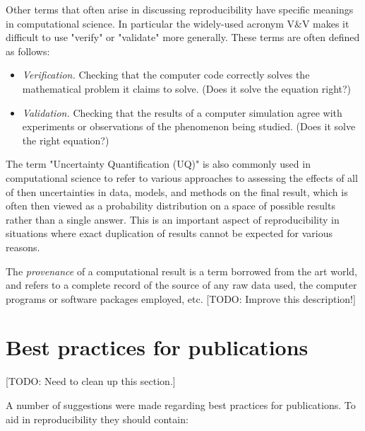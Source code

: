 \documentclass[11pt]{article}
\newcommand{\todo}[1]{{\color{red} [TODO: #1]}}
\newcommand{\todo}[1]{}
\begin{document}
Other terms that often arise in discussing reproducibility have specific
meanings in computational science.  In particular the widely-used acronym
V\&V makes it difficult to use "verify" or "validate" more generally.  These
terms are often defined as follows: 

\begin{itemize} 
\item {\em Verification.}  Checking that the computer code correctly solves the
mathematical problem it claims to solve. (Does it solve the equation right?)

\item {\em Validation.}  Checking that the results of a computer simulation agree with
experiments or observations of the phenomenon being studied.  (Does it solve
the right equation?)
\end{itemize} 

The term "Uncertainty Quantification (UQ)" is also commonly used in
computational science to refer to various approaches to assessing the
effects of all of then uncertainties in data, models, and methods on the
final result, which is often then viewed as a probability distribution on a
space of possible results rather than a single answer.  This is an important
aspect of reproducibility in situations where exact duplication of results
cannot be expected for various reasons.

The {\em provenance} of a computational result is a term borrowed from the
art world, and refers to a complete record of the source of any raw data
used, the computer programs or software packages employed, etc.
\todo{Improve this description!}

\section{Best practices for publications} \label{sec:pubs2}

\todo{Need to clean up this section.}

A number of suggestions were made regarding best practices for publications.
To aid in reproducibility they should contain:
\end{document}
